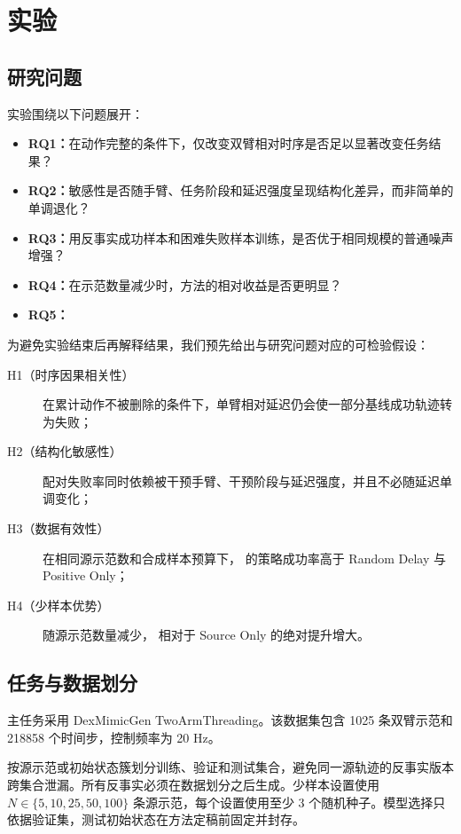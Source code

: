 \section{实验}
\label{sec:experiments}

\subsection{研究问题}

实验围绕以下问题展开：
\begin{itemize}
    \item \textbf{RQ1：}在动作完整的条件下，仅改变双臂相对时序是否足以显著改变任务结果？
    \item \textbf{RQ2：}敏感性是否随手臂、任务阶段和延迟强度呈现结构化差异，而非简单的单调退化？
    \item \textbf{RQ3：}用反事实成功样本和困难失败样本训练，是否优于相同规模的普通噪声增强？
    \item \textbf{RQ4：}在示范数量减少时，方法的相对收益是否更明显？
    \item \textbf{RQ5：}
\end{itemize}

为避免实验结束后再解释结果，我们预先给出与研究问题对应的可检验假设：
\begin{description}
    \item[H1（时序因果相关性）] 在累计动作不被删除的条件下，单臂相对延迟仍会使一部分基线成功轨迹转为失败；
    \item[H2（结构化敏感性）] 配对失败率同时依赖被干预手臂、干预阶段与延迟强度，并且不必随延迟单调变化；
    \item[H3（数据有效性）] 在相同源示范数和合成样本预算下，\method{} 的策略成功率高于 Random Delay 与 Positive Only；
    \item[H4（少样本优势）] 随源示范数量减少，\method{} 相对于 Source Only 的绝对提升增大。
\end{description}

\subsection{任务与数据划分}

主任务采用 DexMimicGen TwoArmThreading。该数据集包含 1025 条双臂示范和 218858 个时间步，控制频率为 20 Hz。

按源示范或初始状态簇划分训练、验证和测试集合，避免同一源轨迹的反事实版本跨集合泄漏。所有反事实必须在数据划分之后生成。少样本设置使用 $N\in\{5,10,25,50,100\}$ 条源示范，每个设置使用至少 3 个随机种子。模型选择只依据验证集，测试初始状态在方法定稿前固定并封存。

